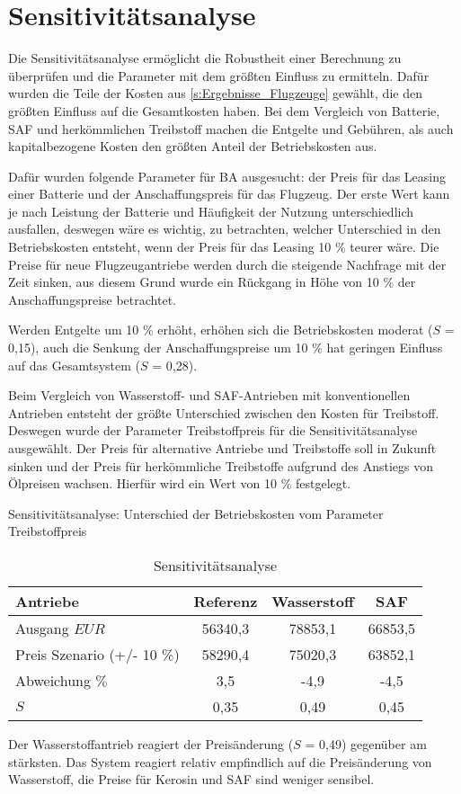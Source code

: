 \section{Sensitivitätsanalyse}
\label{s:Sensitivitätsanalyse}
%
Die Sensitivitätsanalyse ermöglicht die Robustheit einer Berechnung zu überprüfen 
und die Parameter mit dem größten Einfluss zu ermitteln. 
Dafür wurden die Teile der Kosten aus \ref{s:Ergebnisse_Flugzeuge} gewählt, 
die den größten Einfluss auf die Gesamtkosten haben. 
Bei dem Vergleich von Batterie, SAF und herkömmlichen Treibstoff 
machen die Entgelte und Gebühren, als auch kapitalbezogene Kosten den größten Anteil der Betriebskosten aus. %

Dafür wurden folgende Parameter für BA ausgesucht: der Preis für das Leasing einer Batterie 
und der Anschaffungspreis für das Flugzeug.
Der erste Wert kann je nach Leistung der Batterie und Häufigkeit der Nutzung unterschiedlich ausfallen, 
deswegen wäre es wichtig, zu betrachten, welcher Unterschied in den Betriebskosten entsteht, 
wenn der Preis für das Leasing 10 \% teurer wäre. 
Die Preise für neue Flugzeugantriebe werden durch die steigende Nachfrage mit der Zeit sinken, 
aus diesem Grund wurde ein Rückgang in Höhe von 10 \% der Anschaffungspreise betrachtet.

Werden Entgelte um 10 \% erhöht, erhöhen sich die Betriebskosten moderat ($S$ = 0,15), 
auch die Senkung der Anschaffungspreise um 10 \% hat geringen Einfluss auf das Gesamtsystem ($S$ = 0,28).

Beim Vergleich von Wasserstoff- und SAF-Antrieben mit konventionellen Antrieben 
entsteht der größte Unterschied zwischen den Kosten für Treibstoff. 
Deswegen wurde der Parameter \glqq Treibstoffpreis\grqq{} für die Sensitivitätsanalyse ausgewählt.
Der Preis für alternative Antriebe und Treibstoffe soll in Zukunft sinken und der Preis 
für herkömmliche Treibstoffe aufgrund des Anstiegs von Ölpreisen wachsen. 
Hierfür wird ein Wert von 10 \% festgelegt.

\begin{table}[h]
	\begin{center}
    \caption{Sensitivitätsanalyse}{Sensitivitätsanalyse: Unterschied der Betriebskosten vom Parameter Treibstoffpreis}
	\label{sensiv}
	\begin{tabular}{|l|c|c|c|}
		\hline
		\textbf{Antriebe} & \textbf{Referenz}& \textbf{Wasserstoff}& \textbf{SAF} \\ \hline
		Ausgang $EUR$ & 56340,3 & 78853,1 & 66853,5  \\ \hline
        Preis Szenario (+/- 10 \%) & 58290,4  & 75020,3 & 63852,1 \\ \hline
        Abweichung $\%$ & 3,5 & -4,9 & -4,5 \\ \hline
		$S$ & 0,35 & 0,49 & 0,45 \\ \hline
	\end{tabular}
    \end{center}
\end{table}

Der Wasserstoffantrieb reagiert der Preisänderung ($S$ = 0,49) gegenüber am stärksten. 
Das System reagiert relativ empfindlich auf die Preisänderung von Wasserstoff, 
die Preise für Kerosin und SAF sind weniger sensibel.
